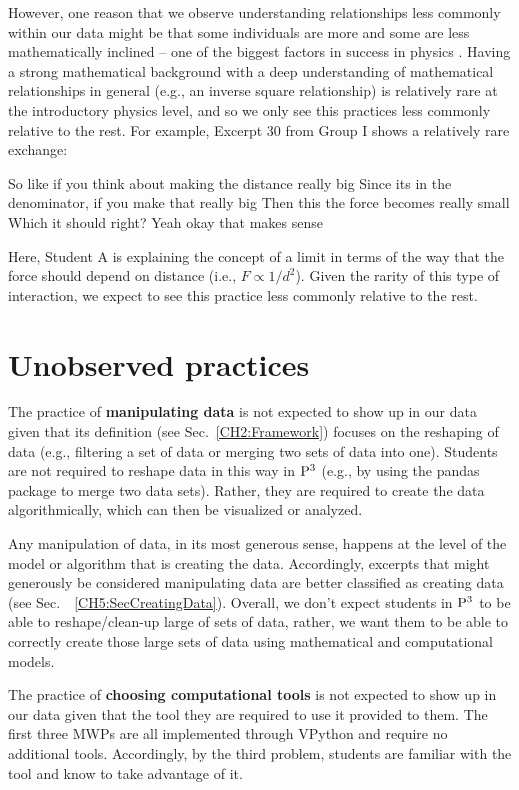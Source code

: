 \documentclass{msuphddissertation}
\begin{document}
\begin{doublespace}
\begin{appendices}
However, one reason that we observe understanding relationships less commonly within our data might be that some individuals are more and some are less mathematically inclined -- one of the biggest factors in success in physics \cite{Bing2009,Redish2005}.  Having a strong mathematical background with a deep understanding of mathematical relationships in general (e.g., an inverse square relationship) is relatively rare at the introductory physics level, and so we only see this practices less commonly relative to the rest.  For example, Excerpt 30 from Group I shows a relatively rare exchange: \begin{description}
\SA So like if you think about making the distance really big
\SA Since its in the denominator, if you make that really big
\SA Then this {the force} becomes really small
\SA Which it should right?
\SB Yeah okay that makes sense
\end{description}  Here, Student A is explaining the concept of a limit in terms of the way that the force should depend on distance (i.e., $F\propto1/d^2$).  Given the rarity of this type of interaction, we expect to see this practice less commonly relative to the rest.

\chapter{Unobserved practices}\label{unobserved}

The practice of \textbf{manipulating data} is not expected to show up in our data given that its definition (see Sec.~\ref{CH2:Framework}) focuses on the reshaping of data (e.g., filtering a set of data or merging two sets of data into one).  Students are not required to reshape data in this way in ${\rm P}^{3}$ (e.g., by using the pandas package to merge two data sets).  Rather, they are required to create the data algorithmically, which can then be visualized or analyzed.

Any manipulation of data, in its most generous sense, happens at the level of the model or algorithm that is creating the data.  Accordingly, excerpts that might generously be considered manipulating data are better classified as creating data (see Sec.~~\ref{CH5:SecCreatingData}).  Overall, we don't expect students in ${\rm P}^{3}$ to be able to reshape/clean-up large of sets of data, rather, we want them to be able to correctly create those large sets of data using mathematical and computational models.

The practice of \textbf{choosing computational tools} is not expected to show up in our data given that the tool they are required to use it provided to them.  The first three MWPs are all implemented through VPython and require no additional tools.  Accordingly, by the third problem, students are familiar with the tool and know to take advantage of it.


\end{appendices}
\end{doublespace}
\end{document}
